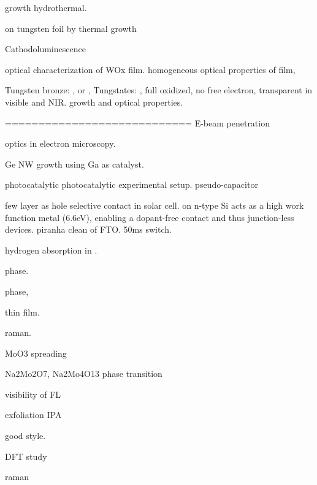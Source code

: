  growth hydrothermal.\cite{Moshofsky2012}

 on tungsten foil by thermal growth\cite{VanHieu2012}

Cathodoluminescence \cite{Parish2007}

optical characterization of WOx film.\cite{Valyukh2010a}
homogeneous optical properties of  film,\cite{Valyukh2010a} 

Tungsten bronze: , or , 
Tungstates: , full oxidized, no free electron, transparent in visible and NIR. 
 growth and optical properties. \cite{Oishi2001} \cite{Itoh2001}

============================
E-beam penetration \cite{Kanaya2002}

optics in electron microscopy. \cite{GarciadeAbajo2010a}

Ge NW growth using Ga as catalyst. \cite{Chandrasekaran2006}

 photocatalytic \cite{Chithambararaj2013}
photocatalytic experimental setup.\cite{Hupka2006}
 pseudo-capacitor  \cite{Brezesinski2010}

 few layer as hole selective contact in solar cell.\cite{Battaglia2014}
 on n-type Si acts as a high work function metal (6.6eV), enabling a dopant-free contact and thus junction-less devices.
piranha clean of FTO. 50ms switch.\cite{Scherer2012} 

hydrogen absorption in .\cite{Sha2009}

 phase. \cite{Bramnik2004}

 phase, \cite{Gatehouse1983}

 thin film. \cite{Carcia1987}

 raman.\cite{Hirata1996}

MoO3 spreading \cite{Leyrer1990}

Na2Mo2O7, Na2Mo4O13 phase transition \cite{SinghMudher2005}\cite{Tangri1992}

visibility of FL \cite{Benameur2011}

exfoliation IPA \cite{Halim2013}  \cite{Zhou2011a}

 good style. \cite{Siciliano2009} \cite{Abdellaoui1997}

  DFT study \cite{B511044K} \cite{Cora1997} \cite{Sayede2005}

 raman \cite{Lee2002}



